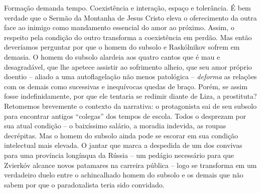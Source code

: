 Formação demanda tempo. Coexistência e interação, espaço e tolerância. É
bem verdade que o Sermão da Montanha de Jesus Cristo eleva o
oferecimento da outra face ao inimigo como mandamento essencial do amor
ao próximo. Assim, o respeito pela condição do outro transforma a
coexistência em perdão. Mas então deveríamos perguntar por que o homem
do subsolo e Raskólnikov sofrem em demasia. O homem do subsolo alardeia
aos quatro cantos que é mau e desagradável, que lhe apetece assistir ao
sofrimento alheio, que seu amor próprio doentio -- aliado a uma
autoflagelação não menos patológica -- \emph{deforma} as relações com os
demais como sucessivas e inequívocas quedas de braço. Porém, se assim
fosse indefinidamente, por que ele tentaria se redimir diante de Liza, a
prostituta? Retomemos brevemente o contexto da narrativa: o protagonista
sai de seu subsolo para encontrar antigos ``colegas'' dos tempos de
escola. Todos o desprezam por sua atual condição -- o baixíssimo
salário, a moradia indevida, as roupas decrépitas. Mas o homem do
subsolo ainda pode se escorar em sua condição intelectual mais elevada.
O jantar que marca a despedida de um dos convivas para uma província
longínqua da Rússia -- um pedágio necessário para que Zvierkóv alcance
novos patamares na carreira pública -- logo se transforma em um
verdadeiro duelo entre o achincalhado homem do subsolo e os demais que
não sabem por que o paradoxalista teria sido convidado.


